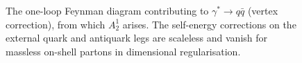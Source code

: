 \begin{figure}[h!]
\centering
{}
\caption{The one-loop Feynman diagram contributing to $\gamma^*\to q\bar q$ (vertex correction), from which $A_2^1$ arises. The self-energy corrections on the external quark and antiquark legs are scaleless and vanish for massless on-shell partons in dimensional regularisation.}
\label{fig:diagA21}
\end{figure}
